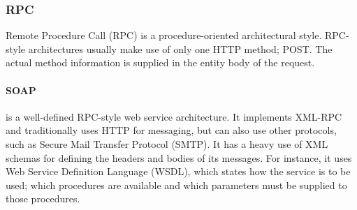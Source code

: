 \subsubsection{RPC}
Remote Procedure Call (RPC) is a procedure-oriented architectural style.
RPC-style architectures usually make use of only one HTTP method; POST.
The actual method information is supplied in the entity body of the request.

\paragraph{SOAP} is a well-defined RPC-style web service architecture.
It implements XML-RPC\cite{xmlrpc_specification} and traditionally uses HTTP for messaging, but can also use other protocols, such as Secure Mail Transfer Protocol (SMTP).
It has a heavy use of XML schemas for defining the headers and bodies of its messages.
For instance, it uses Web Service Definition Language (WSDL), which states how the service is to be used; which procedures are available and which parameters must be supplied to those procedures.
